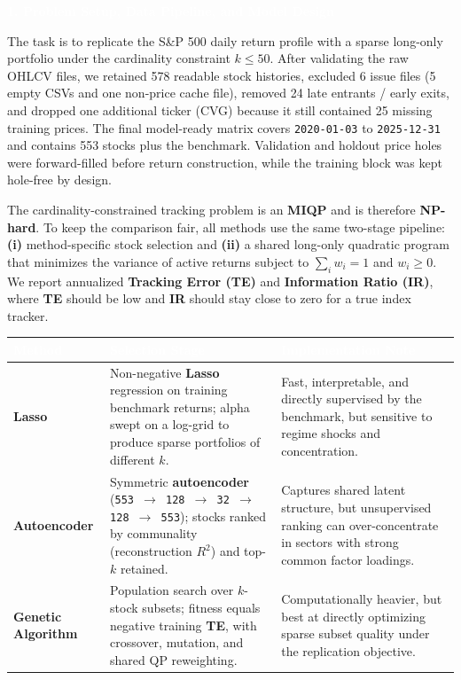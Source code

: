 \documentclass[10pt,a4paper]{article}
\newcommand{\SectionBar}[1]{%
  \vspace{0.22em}
  \noindent\colorbox{ReportBlue}{%
    \parbox{\dimexpr\linewidth-2\fboxsep\relax}{%
      \vspace{2.3pt}\textcolor{white}{\bfseries\footnotesize #1}\vspace{2.3pt}
    }%
  }%
  \vspace{0.28em}
}
\newcommand{\ReadableFiles}{578}
\begin{document}
\SectionBar{1. Problem Setup, Data Pipeline, and Model Design}
{\fontsize{7.55}{9.55}\selectfont\justifying
The task is to replicate the S\&P 500 daily return profile with a sparse long-only portfolio under the cardinality constraint $k \leq 50$. After validating the raw OHLCV files, we retained \ReadableFiles{} readable stock histories, excluded 6 issue files (5 empty CSVs and one non-price cache file), removed 24 late entrants / early exits, and dropped one additional ticker (CVG) because it still contained 25 missing training prices. The final model-ready matrix covers \texttt{2020-01-03} to \texttt{2025-12-31} and contains 553 stocks plus the benchmark. Validation and holdout price holes were forward-filled before return construction, while the training block was kept hole-free by design.

\vspace{3pt}
The cardinality-constrained tracking problem is an \textbf{MIQP} and is therefore \textbf{NP-hard}. To keep the comparison fair, all methods use the same two-stage pipeline: \textbf{(i)} method-specific stock selection and \textbf{(ii)} a shared long-only quadratic program that minimizes the variance of active returns subject to $\sum_i w_i = 1$ and $w_i \ge 0$. We report annualized \textbf{Tracking Error (TE)} and \textbf{Information Ratio (IR)}, where \textbf{TE} should be low and \textbf{IR} should stay close to zero for a true index tracker.
}

\vspace{4pt}
{\fontsize{7.1}{8.9}\selectfont
{}
\begin{tabularx}{\linewidth}{|>{\bfseries\RaggedRight\arraybackslash}p{1.85cm}|>{\RaggedRight\arraybackslash}X|>{\RaggedRight\arraybackslash}p{4.2cm}|}
  \hline
  \rowcolor{ReportBlue}
  \textcolor{white}{\textbf{Method}} & \textcolor{white}{\textbf{Selection Stage}} & \textcolor{white}{\textbf{Implementation Note}} \\
  \hline
  \textbf{Lasso} & Non-negative \textbf{Lasso} regression on training benchmark returns; alpha swept on a log-grid to produce sparse portfolios of different $k$. & Fast, interpretable, and directly supervised by the benchmark, but sensitive to regime shocks and concentration. \\
  \textbf{Autoencoder} & Symmetric \textbf{autoencoder} (\texttt{553 $\rightarrow$ 128 $\rightarrow$ 32 $\rightarrow$ 128 $\rightarrow$ 553}); stocks ranked by communality (reconstruction $R^2$) and top-$k$ retained. & Captures shared latent structure, but unsupervised ranking can over-concentrate in sectors with strong common factor loadings. \\
  \textbf{Genetic Algorithm} & Population search over $k$-stock subsets; fitness equals negative training \textbf{TE}, with crossover, mutation, and shared QP reweighting. & Computationally heavier, but best at directly optimizing sparse subset quality under the replication objective. \\
  \hline
\end{tabularx}
}
\end{document}
